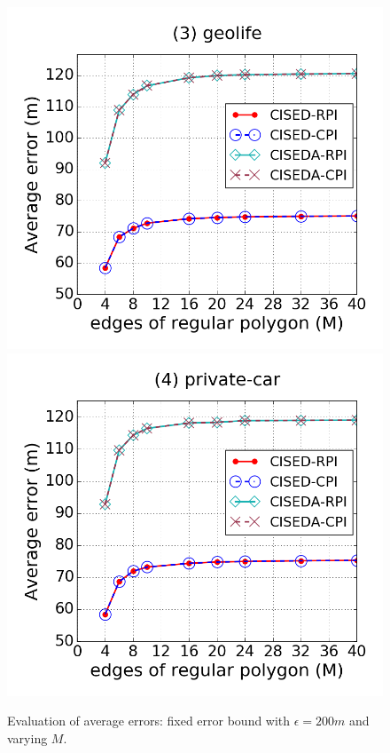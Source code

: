 \begin{figure}[tb!]
\includegraphics[scale = 0.245]{figures/Exp-M-e-200-error-geolife.png}
\includegraphics[scale = 0.245]{figures/Exp-M-e-200-error-private.png}
\vspace{-2ex}
\caption{\small Evaluation of average errors: fixed error bound with $\epsilon = 200m$ and varying $M$.}
\label{fig:m-error-e200}
\vspace{-1ex}
\end{figure}




